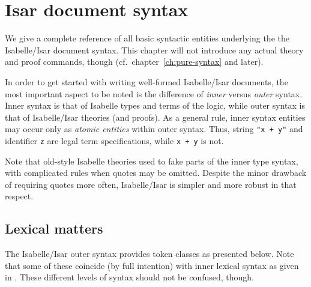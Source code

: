 
\chapter{Isar document syntax}

We give a complete reference of all basic syntactic entities underlying the
the Isabelle/Isar document syntax.  This chapter will not introduce any actual
theory and proof commands, though (cf.\ chapter~\ref{ch:pure-syntax} and
later).

\medskip

In order to get started with writing well-formed Isabelle/Isar documents, the
most important aspect to be noted is the difference of \emph{inner} versus
\emph{outer} syntax.  Inner syntax is that of Isabelle types and terms of the
logic, while outer syntax is that of Isabelle/Isar theories (and proofs).  As
a general rule, inner syntax entities may occur only as \emph{atomic entities}
within outer syntax.  Thus, string \texttt{"x + y"} and identifier \texttt{z}
are legal term specifications, while \texttt{x + y} is not.

\begin{warn}
  Note that old-style Isabelle theories used to fake parts of the inner type
  syntax, with complicated rules when quotes may be omitted.  Despite the
  minor drawback of requiring quotes more often, Isabelle/Isar is simpler and
  more robust in that respect.
\end{warn}


\section{Lexical matters}\label{sec:lex-syntax}

The Isabelle/Isar outer syntax provides token classes as presented below.
Note that some of these coincide (by full intention) with inner lexical syntax
as given in \cite{isabelle-ref}.  These different levels of syntax should not
be confused, though.


